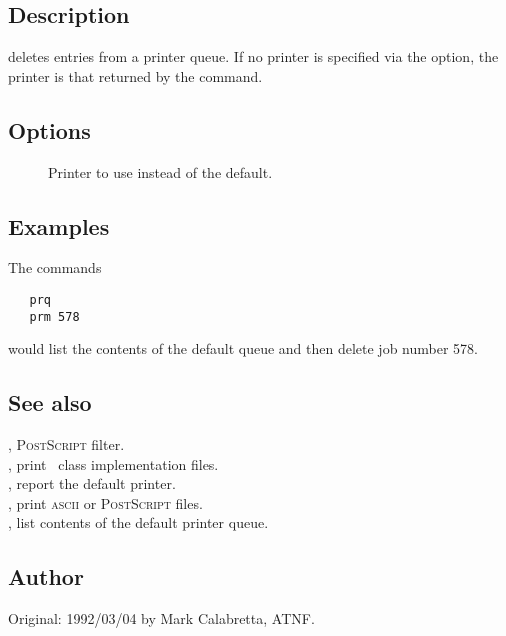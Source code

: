 \subsection*{Description}

 deletes entries from a printer queue.  If no printer is specified
via the  option, the printer is that returned by the 
command.

\subsection*{Options}

\begin{description}
\item[]
   Printer to use instead of the default.
\end{description}

\subsection*{Examples}

The commands

\begin{verbatim}
   prq
   prm 578
\end{verbatim}

\noindent
would list the contents of the default queue and then delete job number 578.

\subsection*{See also}

, \textsc{PostScript} filter.\\
, print \aipspp\ class implementation files.\\
, report the default printer.\\
, print \textsc{ascii} or \textsc{PostScript} files.\\
, list contents of the default printer queue.

\subsection*{Author}

Original: 1992/03/04 by Mark Calabretta, ATNF.


